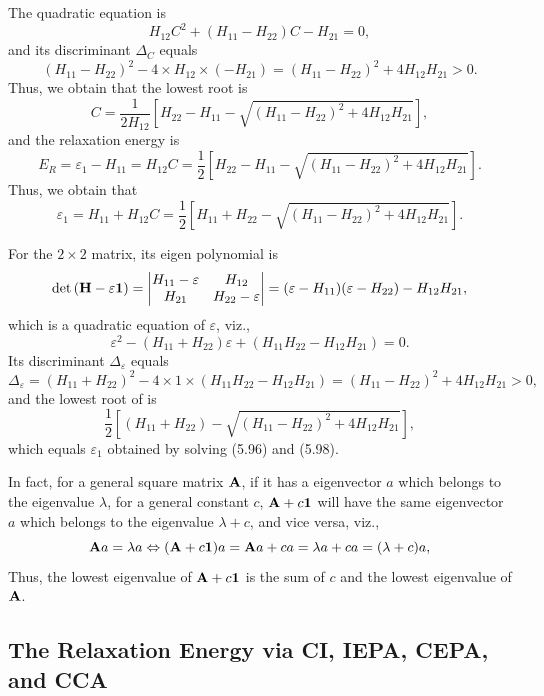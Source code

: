 \documentclass[a4paper]{book}
\newcounter{solution}[chapter]
\renewcommand\det[1]{\mathrm{det\left(#1\right)}}
\newcommand{\A}{{\bf A}}
\newcommand{\I}{{\bf 1}}
\newcommand{\HH}{{\bf H}}
\begin{document}
	\begin{solution}
	The quadratic equation is	
	\[
		H_{12} C^2 + ( H_{11} - H_{22} ) C - H_{21} = 0,
	\]	
	and its discriminant $\Delta_C$ equals
	\[
		( H_{11} - H_{22} )^2 - 4 \times H_{12} \times ( -H_{21} ) = ( H_{11} - H_{22} )^2 + 4 H_{12} H_{21} > 0.
	\]
	Thus, we obtain that the lowest root is
	\[
		C = \frac{1}{ 2H_{12} } \left[ H_{22} - H_{11} - \sqrt{ ( H_{11} - H_{22} )^2 + 4 H_{12} H_{21} } \right],
	\]
	and the relaxation energy is
	\[
		E_R = \varepsilon_1 - H_{11} = H_{12} C = \frac{1}{ 2 } \left[ H_{22} - H_{11} - \sqrt{ ( H_{11} - H_{22} )^2 + 4 H_{12} H_{21} } \right] .
	\]
	Thus, we obtain that
	\[
		\varepsilon_1 = H_{11} + H_{12} C = \frac{1}{ 2 } \left[ H_{11} + H_{22} - \sqrt{ ( H_{11} - H_{22} )^2 + 4 H_{12} H_{21} } \right] .
	\]
	
	For the $2 \times 2$ matrix, its eigen polynomial is
	\[
		\det{ \HH - \varepsilon \I } = \begin{vmatrix}
			H_{11} - \varepsilon & H_{12} \\ H_{21} & H_{22} - \varepsilon
		\end{vmatrix} = ( \varepsilon - H_{11} ) ( \varepsilon - H_{22} ) - H_{12} H_{21},
	\]
	which is a quadratic equation of $\varepsilon$, viz.,
	\[
		\varepsilon^2 - ( H_{11} + H_{22} ) \varepsilon + ( H_{11} H_{22} - H_{12} H_{21} ) = 0.
	\]
	Its discriminant $\Delta_\varepsilon$ equals
	\[
		\Delta_\varepsilon = ( H_{11} + H_{22} )^2 - 4 \times 1 \times ( H_{11} H_{22} - H_{12} H_{21} ) = ( H_{11} - H_{22} )^2 + 4 H_{12} H_{21} > 0,
	\]
	and the lowest root of is
	\[
		\frac{1}{2} \left[ ( H_{11} + H_{22} ) - \sqrt{ ( H_{11} - H_{22} )^2 + 4 H_{12} H_{21} } \right],
	\]
	which equals $\varepsilon_1$ obtained by solving (5.96) and (5.98).	
	
	In fact, for a general square matrix $\A$, if it has a eigenvector $a$ which belongs to the eigenvalue $\lambda$, for a general constant $c$, $\A+c\I$ will have the same eigenvector $a$ which belongs to the eigenvalue $\lambda + c$, and vice versa, viz.,
	\[
		\A a = \lambda a \Leftrightarrow (\A + c \I) a = \A a + c a = \lambda a + c a = (\lambda + c) a,
	\]
	Thus, the lowest eigenvalue of $\A+c\I$ is the sum of $c$ and the lowest eigenvalue of $\A$.
	
	\end{solution}
	
	\subsection{The Relaxation Energy via CI, IEPA, CEPA, and CCA}
	
\end{document}
